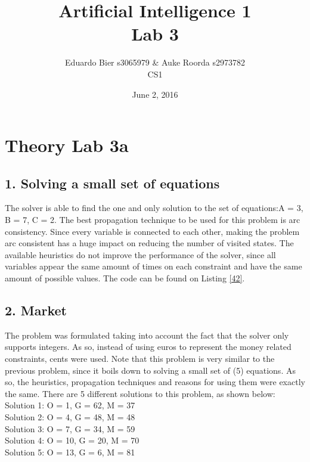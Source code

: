 \documentclass{article}
\title{Artificial Intelligence 1 \\ Lab 3}%
\author{Eduardo Bier s3065979 \& Auke Roorda s2973782 \\ CS1} %
\date{June 2, 2016}%
\begin{document}
\maketitle

\section*{Theory Lab 3a}
\subsection*{1.  Solving a small set of equations}
The solver is able to find the one and only solution to the set of equations:\linebreak A = 3, B = 7, C = 2. The best propagation technique to be used for this problem is arc consistency. Since every variable is connected to each other, making the problem arc consistent has a huge impact on reducing the number of visited states. The available heuristics do not improve the performance of the solver, since all variables appear the same amount of times on each constraint and have the same amount of possible values. The code can be found on Listing \ref{42}.



\subsection*{2.  Market}
The problem was formulated taking into account the fact that the solver only supports integers. As so, instead of using euros to represent the money related constraints, cents were used. Note that this problem is very similar to the previous problem, since it boils down to solving a small set of (5) equations. As so, the heuristics, propagation techniques and reasons for using them were exactly the same. There are 5 different solutions to this problem, as shown below:\\

Solution 1:
O = 	1, 
G = 	62,
M = 	37 \\

Solution 2:
O = 	4, 
G = 	48, 
M = 	48 \\

Solution 3:
O = 	7, 
G = 	34, 
M = 	59 \\

Solution 4:
O = 	10, 
G = 	20, 
M = 	70 \\

Solution 5:
O = 	13, 
G = 	6, 
M = 	81 \\
\end{document}
